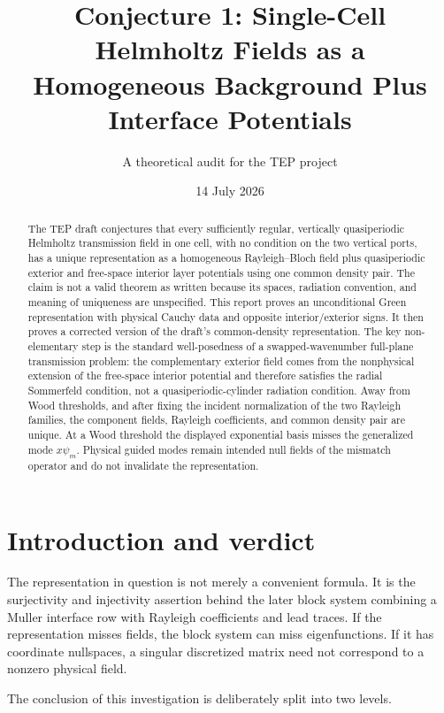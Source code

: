 \documentclass[11pt]{article}
\title{Conjecture 1: Single-Cell Helmholtz Fields as a Homogeneous Background Plus Interface Potentials}
\author{A theoretical audit for the TEP project}
\date{14 July 2026}
\theoremstyle{plain}
\theoremstyle{definition}
\theoremstyle{remark}
\begin{document}
\maketitle

\begin{abstract}
The TEP draft conjectures that every sufficiently regular, vertically
quasiperiodic Helmholtz transmission field in one cell, with no condition on
the two vertical ports, has a unique representation as a homogeneous
Rayleigh--Bloch field plus quasiperiodic exterior and free-space interior layer
potentials using one common density pair.  The claim is not a valid theorem as
written because its spaces, radiation convention, and meaning of uniqueness are
unspecified.  This report proves an unconditional Green representation with
physical Cauchy data and opposite interior/exterior signs.  It then proves a
corrected version of the draft's common-density representation.  The key
non-elementary step is the standard well-posedness of a swapped-wavenumber
full-plane transmission problem: the complementary exterior field comes from
the nonphysical extension of the free-space interior potential and therefore
satisfies the radial Sommerfeld condition, not a quasiperiodic-cylinder
radiation condition.  Away from Wood thresholds, and after fixing the incident
normalization of the two Rayleigh families, the component fields, Rayleigh
coefficients, and common density pair are unique.  At a Wood threshold the
displayed exponential basis misses the generalized mode \(x\psi_m\).  Physical
guided modes remain intended null fields of the mismatch operator and do not
invalidate the representation.
\end{abstract}

\tableofcontents

\section{Introduction and verdict}

The representation in question is not merely a convenient formula.  It is the
surjectivity and injectivity assertion behind the later block system combining
a Muller interface row with Rayleigh coefficients and lead traces.  If the
representation misses fields, the block system can miss eigenfunctions.  If it
has coordinate nullspaces, a singular discretized matrix need not correspond
to a nonzero physical field.

The conclusion of this investigation is deliberately split into two levels.
\end{document}
